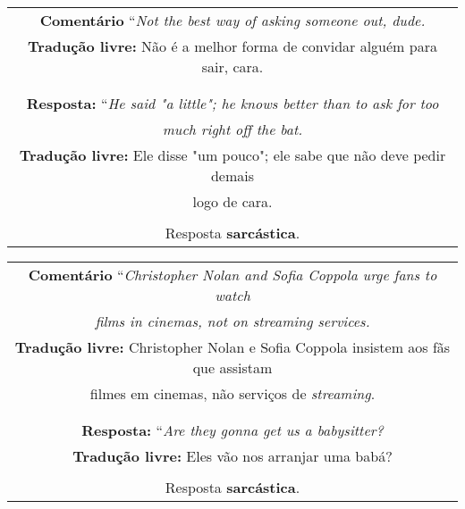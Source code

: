 \begin{center}
\begin{tabular}{|c|}

\hline

\textbf{Comentário} ``\textit{Not the best way of asking someone out, dude.} \\

\textbf{Tradução livre:} Não é a melhor forma de convidar alguém para sair,
cara. \\ \\

\hline

\\

\textbf{Resposta:} ``\textit{He said "a little"; he knows better than to ask for
too} \\
\textit{much right off the bat.} \\

\textbf{Tradução livre:} Ele disse "um pouco"; ele sabe que não deve pedir demais \\
logo de cara. \\ \\

Resposta \textbf{sarcástica}.

\\ \hline

\end{tabular}
\end{center}

\begin{center}
\begin{tabular}{|c|}

\hline

\textbf{Comentário} ``\textit{Christopher Nolan and Sofia Coppola urge fans to
watch} \\
\textit{films in cinemas, not on streaming services.} \\

\textbf{Tradução livre:} Christopher Nolan e Sofia Coppola insistem aos fãs que
assistam \\
filmes em cinemas, não serviços de \textit{streaming}. \\ \\

\hline

\\

\textbf{Resposta:} ``\textit{Are they gonna get us a babysitter?} \\

\textbf{Tradução livre:} Eles vão nos arranjar uma babá? \\ \\

Resposta \textbf{sarcástica}.

\\ \hline

\end{tabular}
\end{center}

